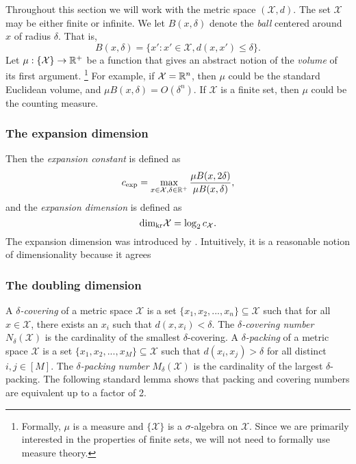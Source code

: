 \documentclass[../main.tex]{subfiles}
\newcommand{\set}[1]{\mathcal {#1}}
\newcommand{\dist}[2]{\distf({#1},{#2})}
\newcommand{\distf}{d}
\newcommand{\krdim}{\text{dim}_\textnormal{kr}}
\newcommand{\krnum}{c_\textnormal{exp}}
\begin{document}
Throughout this section we will work with the metric space $(\set X,d)$.
The set $\set X$ may be either finite or infinite.
We let $B(x,\delta)$ denote the \emph{ball} centered around $x$ of radius $\delta$. 
That is,
\begin{equation}
    B(x,\delta) = \{ x' : x'\in\set X, \dist{x}{x'} \le \delta \}.
\end{equation}
Let $\mu : \{\set X\} \to \R^+$ be a function that gives an abstract notion of the \emph{volume} of its first argument.%
\footnote{
    Formally, $\mu$ is a measure and $\{\set X\}$ is a $\sigma$-algebra on $\set X$.
    Since we are primarily interested in the properties of finite sets,
    we will not need to formally use measure theory.
}
For example, if $\set X=\R^n$, then $\mu$ could be the standard Euclidean volume,
and $\mu B(x,\delta) = O(\delta^n)$.
If $\set X$ is a finite set, then $\mu$ could be the counting measure.


\subsubsection{The expansion dimension}

Then the \emph{expansion constant} is defined as
\begin{equation}
    \krnum = \max_{x\in\set X, \delta\in\R^+} \frac{\mu B(x,2\delta)}{\mu B(x,\delta)}
    ,
\end{equation}
and the \emph{expansion dimension} is defined as
\begin{equation}
    \krdim\set X = \log_2 c_\set X
    .
\end{equation}
The expansion dimension was introduced by \citet{karger2002finding}.
Intuitively, it is a reasonable notion of dimensionality because it agrees


\subsubsection{The doubling dimension}

A \emph{$\delta$-covering} of a metric space $\set X$ is a set $\{x_1,x_2,...,x_n\} \subseteq \set X$ such that for all $x\in\set X$, there exists an $x_i$ such that $\dist{x}{x_i} < \delta$.
The \emph{$\delta$-covering number} $N_\delta(\set X)$ is the cardinality of the smallest $\delta$-covering.
A \emph{$\delta$-packing} of a metric space $\set X$ is a set $\{x_1,x_2,...,x_M\} \subseteq \set X$ such that $\dist{x_i}{x_j} > \delta$ for all distinct $i,j\in[M]$.
The \emph{$\delta$-packing number} $M_\delta (\set X)$ is the cardinality of the largest $\delta$-packing.
The following standard lemma shows that packing and covering numbers are equivalent up to a factor of 2.
\end{document}
